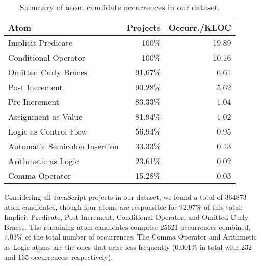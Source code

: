 \begin{table}[ht]
  \centering
\caption{Summary of atom candidate occurrences in our dataset.}
\label{tab:occurrences-summary}
\setlength\tabcolsep{2pt} %
\begin{tabular}{lrr}%
  \toprule
Atom & Projects & Occurr./KLOC \\%
  \midrule
Implicit Predicate & 100\% & 19.89 \\%
  Conditional Operator & 100\% & 10.16 \\%
  Omitted Curly Braces & 91.67\% & 6.61 \\%
  Post Increment & 90.28\% & 5.62 \\%
  Pre Increment & 83.33\% & 1.04 \\%
  Assignment as Value & 81.94\% & 1.02 \\%
  Logic as Control Flow & 56.94\% & 0.95 \\%
  Automatic Semicolon Insertion & 33.33\% & 0.13 \\%
  Arithmetic as Logic & 23.61\% & 0.02 \\%
  Comma Operator & 15.28\% & 0.03 \\%
   \bottomrule
\end{tabular}
  
\end{table}


Considering all JavaScript projects in our dataset, we found a total of \num[group-separator = {,}]{364873} atom candidates, though four atoms are responsible
for 92.97\% of this total: Implicit Predicate, Post Increment, Conditional Operator, and Omitted Curly Braces. 
The remaining atom
candidates comprise \num[group-separator = {,}]{25621} occurrences combined, 7.03\% of the total number of occurrences.
The Comma Operator and Arithmetic as Logic atoms are the ones that arise less
frequently (0.001\% in total with 232 and 165 occurrences, respectively). 

